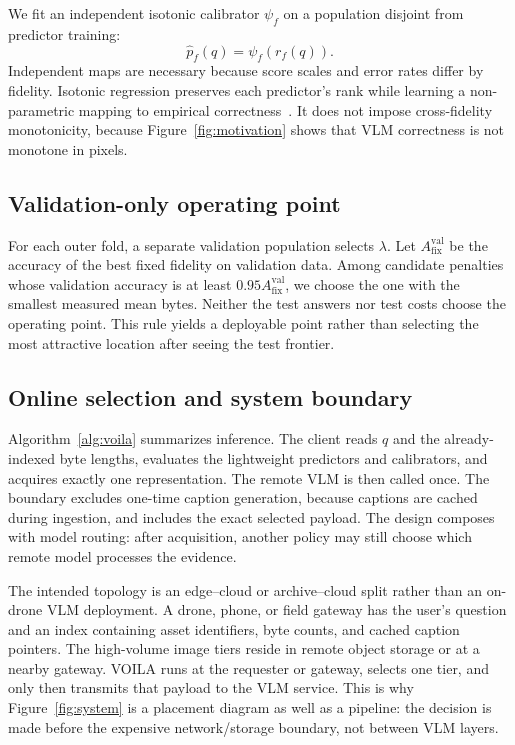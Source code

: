 \documentclass[10pt,conference]{IEEEtran}
\newcommand{\system}{\textsc{VOILA}\xspace}
\begin{document}
We fit an independent isotonic calibrator $\psi_f$ on a population disjoint
from predictor training:
\begin{equation}
  \widehat p_f(q)=\psi_f(r_f(q)).
  \label{eq:calibration}
\end{equation}
Independent maps are necessary because score scales and error rates differ by
fidelity. Isotonic regression preserves each predictor's rank while learning a
non-parametric mapping to empirical correctness~\cite{
guo2017calibrationmodernneuralnetworks}. It does not impose cross-fidelity
monotonicity, because Figure~\ref{fig:motivation} shows that VLM correctness is
not monotone in pixels.

\subsection{Validation-only operating point}

For each outer fold, a separate validation population selects $\lambda$.
Let $A_{\mathrm{fix}}^{\mathrm{val}}$ be the accuracy of the best fixed
fidelity on validation data. Among candidate penalties whose validation
accuracy is at least $0.95A_{\mathrm{fix}}^{\mathrm{val}}$, we choose the one
with the smallest measured mean bytes. Neither the test answers nor test costs
choose the operating point. This rule yields a deployable point rather than
selecting the most attractive location after seeing the test frontier.

\subsection{Online selection and system boundary}

Algorithm~\ref{alg:voila} summarizes inference. The client reads $q$ and the
already-indexed byte lengths, evaluates the lightweight predictors and
calibrators, and acquires exactly one representation. The remote VLM is then
called once. The boundary excludes one-time caption generation, because
captions are cached during ingestion, and includes the exact selected payload.
The design composes with model routing: after acquisition, another policy may
still choose which remote model processes the evidence.

The intended topology is an edge--cloud or archive--cloud split rather than an
on-drone VLM deployment. A drone, phone, or field gateway has the user's
question and an index containing asset identifiers, byte counts, and cached
caption pointers. The high-volume image tiers reside in remote object storage or
at a nearby gateway. \system runs at the requester or gateway, selects one tier,
and only then transmits that payload to the VLM service. This is why
Figure~\ref{fig:system} is a placement diagram as well as a pipeline: the
decision is made before the expensive network/storage boundary, not between VLM
layers.
\end{document}
